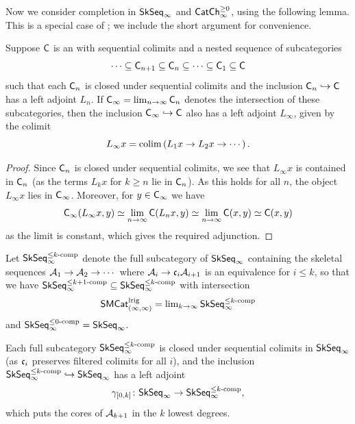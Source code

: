 \documentclass[a4paper,11pt]{article}
\begin{document}
Now we consider completion in $\SkSeq_{\infty}$ and $\CChp_{\infty}$,
using the following lemma. This is a special case of
\cite[Theorem~A]{GeissCofiltered}; we include the short argument for
convenience.
\begin{lemma}\label{lem:seq of locns}
  Suppose $\oC$ is an \icat{} with sequential colimits and a nested sequence of
  subcategories
  \[ \dots \subseteq \oC_{n+1} \subseteq \oC_{n} \subseteq \cdots
    \subseteq \oC_{1} \subseteq \oC\]
  such that each $\oC_{n}$ is closed under sequential colimits and the
  inclusion $\oC_{n} \hookrightarrow \oC$ has a left adjoint
  $L_{n}$. If $\oC_{\infty} = \lim_{n \rightarrow \infty} \oC_{n}$
  denotes the intersection of these subcategories, then the inclusion
  $\oC_{\infty} \hookrightarrow \oC$ also has a left adjoint
  $L_{\infty}$, given by the colimit
  \[ L_{\infty}x = \colim \left(L_{1}x \to L_{2}x \to \cdots\right).\]
\end{lemma}
\begin{proof}
  Since $\oC_{n}$ is closed under sequential colimits, we see that
  $L_{\infty}x$ is contained in $\oC_{n}$ (as the terms $L_{k}x$ for
  $k \geq n$ lie in $\oC_{n}$). As this holds for all $n$, the object
  $L_{\infty}x$ lies in $\oC_{\infty}$. Moreover, for $y \in
  \oC_{\infty}$ we have
  \[ \oC_{\infty}(L_{\infty}x,y) \simeq \limP_{n \rightarrow
      \infty}\oC(L_{n}x, y) \simeq \limP_{n \rightarrow
      \infty}\oC(x, y) \simeq \oC(x,y) \]
  as the limit is constant, which gives the required adjunction.
\end{proof}

\begin{notation}
  Let $\SkSeqIcl{k}$ denote the full subcategory of $\SkSeqI$
  containing the skeletal sequences $\nA_{1} \to \nA_{2}
  \to \cdots$ where $\nA_{i} \to \core[i] \nA_{i+1}$ is an equivalence for $i
  \leq k$, so that we have $\SkSeqIcl{k+1} \subseteq \SkSeqIcl{k}$ with intersection
  \[ \SMCatII^{\lrig} = \lim_{k \rightarrow \infty}\SkSeqIcl{k} \]
  and
   $\SkSeqIcl{0} = \SkSeqI$.
\end{notation}

\begin{observation}
  Each full subcategory $\SkSeqIcl{k}$ is closed under sequential
  colimits in $\SkSeqI$ (as $\core[i]$ preserves filtered colimits for
  all $i$), and the
  inclusion $\SkSeqIcl{k} \hookrightarrow \SkSeqI$ has a left adjoint
  \[ \gamma_{[0,k]} \colon \SkSeqI \to \SkSeqIcl{k},\]
  which puts the cores of $\nA_{k+1}$ in the $k$ lowest degrees.
\end{observation}
\end{document}
